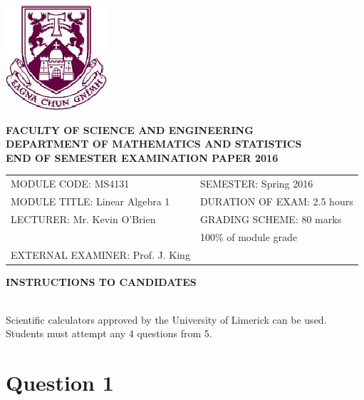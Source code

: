 \documentclass[a4paper,12pt]{article}
\begin{document}
\begin{center}
\includegraphics[scale=0.65]{shieldtransparent2}
\end{center}

\begin{center}
\vspace{1cm}
\large \bf {FACULTY OF SCIENCE AND ENGINEERING} \\[0.5cm]
\normalsize DEPARTMENT OF MATHEMATICS AND STATISTICS \\[1.25cm]
\large \bf {END OF SEMESTER EXAMINATION PAPER 2016} \\[1.5cm]
\end{center}

\begin{tabular}{ll}
MODULE CODE: MS4131 & SEMESTER: Spring 2016 \\[1cm]
MODULE TITLE: Linear Algebra 1 & DURATION OF EXAM: 2.5 hours \\[1cm]
LECTURER: Mr. Kevin O'Brien & GRADING SCHEME: 80 marks \\
& \phantom{GRADING SCHEME:} \footnotesize {100\% of module grade} \\[0.8cm]
EXTERNAL EXAMINER: Prof. J. King & \\
\end{tabular}
\bigskip
\begin{center}
{\bf INSTRUCTIONS TO CANDIDATES}
\end{center}

{\noindent \\ Scientific calculators approved by the University of Limerick can be used. \\
Students must attempt any 4 questions from 5.}
\newpage
\large
\section*{Question 1}
\end{document}
